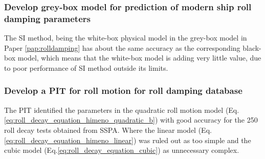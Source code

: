 \subsubsection*{Develop grey-box model for prediction of modern ship roll             damping parameters}
The SI method, being the white-box physical model in the grey-box model in Paper \ref{pap:rolldamping} has about the same accuracy as the corresponding black-box model, which means that the white-box model is adding very little value, due to poor performance of SI method outside its limits.

\subsubsection*{Develop a PIT for roll motion for roll damping database}
The PIT identified the parameters in the quadratic roll motion model (Eq.\ref{eq:roll_decay_equation_himeno_quadratic_b}) with good accuracy for the 250 roll decay tests obtained from SSPA. Where the linear model (Eq.\ref{eq:roll_decay_equation_himeno_linear}) was ruled out as too simple and the cubic model (Eq.\ref{eq:roll_decay_equation_cubic}) as unnecessary complex.   
